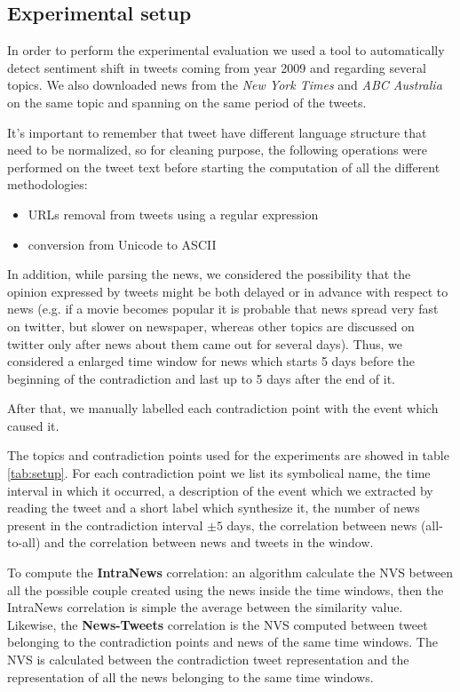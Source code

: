 \subsection*{Experimental setup}
In order to perform the experimental evaluation we used a tool to automatically
detect sentiment shift in tweets coming from year 2009 and regarding several
topics. We also downloaded news from the \emph{New York Times} and \emph{ABC
Australia} on the same topic and spanning on the same period of the tweets.

It's important to remember that tweet have different language structure that need to be normalized, so for cleaning purpose, the following operations were performed on the tweet text before starting the computation of all the different methodologies:
\begin{itemize}
	\item URLs removal from tweets using a regular expression
	\item conversion from Unicode to ASCII
\end{itemize}

In addition, while parsing the news, we considered the possibility that the
opinion expressed by tweets might be both delayed or in advance with respect to
news (e.g. if a movie becomes popular it is probable that news spread very fast
on twitter, but slower on newspaper, whereas other topics are discussed on
twitter only after news about them came out for several days). Thus, we
considered a enlarged time window for news which starts 5 days before the
beginning of the contradiction and last up to 5 days after the end of it.

After that, we manually labelled each contradiction point with the event which
caused it. 

The topics and contradiction points used for the experiments 
are showed in table \ref{tab:setup}. For each contradiction point we list its
symbolical name, the time interval in which it occurred, a description of the event
which we extracted by reading the tweet and a short label which synthesize it,
the number of news present in the contradiction interval $\pm 5$ days,
the correlation between news (all-to-all) and the correlation between news and tweets in the window.

To compute the \textbf{IntraNews} correlation: an algorithm calculate the NVS between all the possible couple created
using the news inside the time windows, then the IntraNews correlation is simple the average between the similarity value.
Likewise, the \textbf{News-Tweets} correlation is the NVS computed between tweet belonging to the contradiction points and 
news of the same time windows. The NVS is calculated between the contradiction tweet representation and the representation of all the news belonging to the same time windows. 

